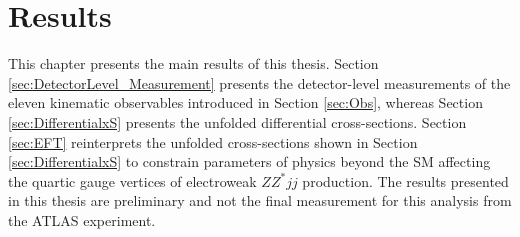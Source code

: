 \part {\LARGE{Results}}
\label{sec:Results}

This chapter presents the main results of this thesis. Section \ref{sec:DetectorLevel_Measurement} presents the detector-level measurements of the eleven kinematic observables introduced in Section \ref{sec:Obs}, whereas Section \ref{sec:DifferentialxS} presents the unfolded differential cross-sections. Section \ref{sec:EFT} reinterprets the unfolded cross-sections shown in Section \ref{sec:DifferentialxS} to constrain parameters of physics beyond the SM affecting the quartic gauge vertices of electroweak $ZZ^*jj$ production. The results presented in this thesis are preliminary and not the final measurement for this analysis from the ATLAS experiment.




